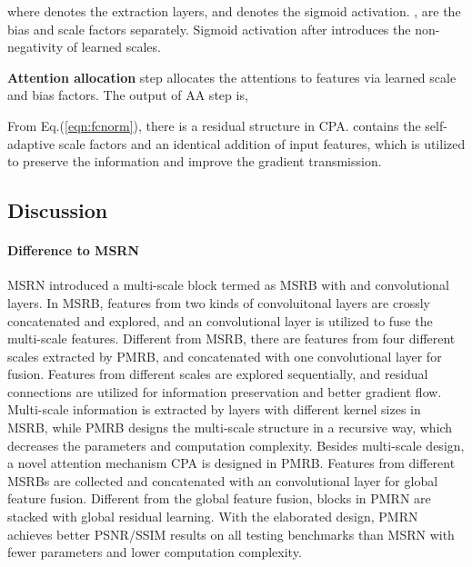 \documentclass[journal]{IEEEtran}
\begin{document}
where  denotes the extraction layers, and  denotes the sigmoid activation. ,  are the bias and scale factors separately. Sigmoid activation after  introduces the non-negativity of learned scales.

\textbf{Attention allocation} step allocates the attentions to features via learned scale and bias factors. The output of AA step is,

From Eq.(\ref{eqn:fcnorm}), there is a residual structure in CPA.  contains the self-adaptive scale factors and an identical addition of input features, which is utilized to preserve the information and improve the gradient transmission.

	
\subsection{Discussion}
\paragraph{Difference to MSRN~\cite{msrn}}
MSRN introduced a multi-scale block termed as MSRB with  and  convolutional layers. In MSRB, features from two kinds of convoluitonal layers are crossly concatenated and explored, and an  convolutional layer is utilized to fuse the multi-scale features. 
Different from MSRB, there are features from four different scales extracted by PMRB, and concatenated with one convolutional layer for fusion. Features from different scales are explored sequentially, and residual connections are utilized for information preservation and better gradient flow. 
Multi-scale information is extracted by layers with different kernel sizes in MSRB, while PMRB designs the multi-scale structure in a recursive way, which decreases the parameters and computation complexity. 
Besides multi-scale design, a novel attention mechanism CPA is designed in PMRB. Features from different MSRBs are collected and concatenated with an convolutional layer for global feature fusion. Different from the global feature fusion, blocks in PMRN are stacked with global residual learning. With the elaborated design, PMRN achieves better PSNR/SSIM results on all testing benchmarks than MSRN with fewer parameters and lower computation complexity.
\end{document}
